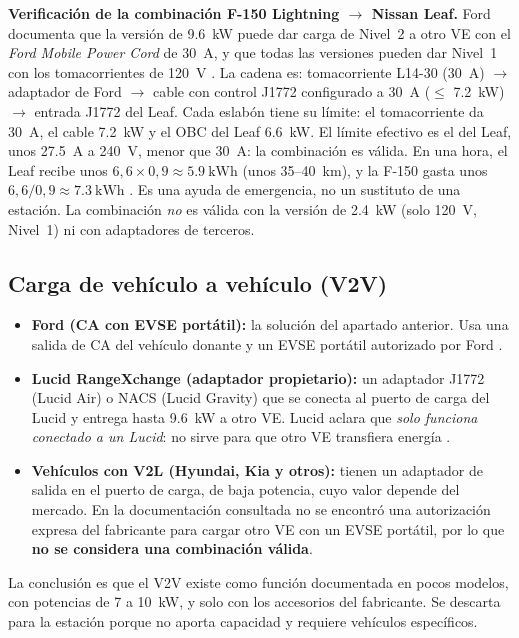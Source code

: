 \textbf{Verificación de la combinación F-150 Lightning $\rightarrow$ Nissan Leaf.} Ford documenta que la versión de \SI{9.6}{\kilo\watt} puede dar carga de Nivel~2 a otro VE con el \emph{Ford Mobile Power Cord} de 30~A, y que todas las versiones pueden dar Nivel~1 con los tomacorrientes de 120~V \cite{fordFAQ}. La cadena es: tomacorriente L14-30 (\SI{30}{\ampere}) $\rightarrow$ adaptador de Ford $\rightarrow$ cable con control J1772 configurado a \SI{30}{\ampere} ($\le$ \SI{7.2}{\kilo\watt}) $\rightarrow$ entrada J1772 del Leaf. Cada eslabón tiene su límite: el tomacorriente da \SI{30}{\ampere}, el cable \SI{7.2}{\kilo\watt} y el OBC del Leaf \SI{6.6}{\kilo\watt}. El límite efectivo es el del Leaf, unos \SI{27.5}{\ampere} a 240~V, menor que \SI{30}{\ampere}: la combinación es válida. En una hora, el Leaf recibe unos $6{,}6 \times 0{,}9 \approx \SI{5.9}{\kilo\watt\hour}$ (unos 35--40~km), y la F-150 gasta unos $6{,}6/0{,}9 \approx \SI{7.3}{\kilo\watt\hour}$ \supuesto{}. Es una ayuda de emergencia, no un sustituto de una estación. La combinación \emph{no} es válida con la versión de \SI{2.4}{\kilo\watt} (solo 120~V, Nivel~1) ni con adaptadores de terceros.

\subsection{Carga de vehículo a vehículo (V2V)}
\begin{itemize}
\item \textbf{Ford (CA con EVSE portátil):} la solución del apartado anterior. Usa una salida de CA del vehículo donante y un EVSE portátil autorizado por Ford \cite{fordFAQ}.
\item \textbf{Lucid RangeXchange (adaptador propietario):} un adaptador J1772 (Lucid Air) o NACS (Lucid Gravity) que se conecta al puerto de carga del Lucid y entrega hasta \SI{9.6}{\kilo\watt} a otro VE. Lucid aclara que \emph{solo funciona conectado a un Lucid}: no sirve para que otro VE transfiera energía \cite{lucidRX}.
\item \textbf{Vehículos con V2L (Hyundai, Kia y otros):} tienen un adaptador de salida en el puerto de carga, de baja potencia, cuyo valor depende del mercado. En la documentación consultada no se encontró una autorización expresa del fabricante para cargar otro VE con un EVSE portátil, por lo que \textbf{no se considera una combinación válida}.
\end{itemize}
La conclusión es que el V2V existe como función documentada en pocos modelos, con potencias de 7 a \SI{10}{\kilo\watt}, y solo con los accesorios del fabricante. Se descarta para la estación porque no aporta capacidad y requiere vehículos específicos.

